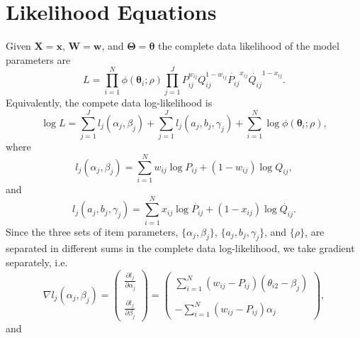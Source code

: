 \documentclass[doc]{apa7}
\begin{document}
  \section{Likelihood Equations}
  Given $\bm{X} = \bm{x}$, $\bm{W} = \bm{w}$, and $\bm{\Theta} = \bm{\theta}$
  the complete data likelihood of the model parameters are
  \begin{equation}
    L = \prod_{i=1}^{N} \phi(\bm{\theta}_i;\rho)\prod_{j=1}^{J} P_{ij}^{w_{ij}} Q_{ij}^{1-w_{ij}}
    \dot{P_{ij}}^{x_{ij}} \dot{Q_{ij}}^{1-x_{ij}}.
  \end{equation}
  Equivalently, the compete data log-likelihood is
  \begin{equation}
    \log L = \sum_{j=1}^{J}l_j(\alpha_j, \beta_j) + \sum_{j=1}^{J}l_j(a_j,
    b_j,\gamma_j) + \sum_{i=1}^{N} \log \phi(\bm{\theta}_i;\rho),
  \end{equation}
  where
  \begin{equation}
    l_j(\alpha_j, \beta_j) = \sum_{i=1}^{N} w_{ij}\log P_{ij} + (1-w_{ij})\log
    Q_{ij},
  \end{equation}
  and
  \begin{equation}
    l_j(a_j,b_j,\gamma_j) = \sum_{i=1}^{N} x_{ij}\log \dot{P_{ij}} + (1-x_
    {ij})\log \dot{Q_{ij}}.
  \end{equation}
  Since the three sets of item parameters, $\{\alpha_j, \beta_j\}$, $\{a_j,
  b_j, \gamma_j\}$, and $\{\rho\}$, are separated in different sums in the
  complete data log-likelihood, we take gradient separately, i.e.
  \begin{equation}
  \label{eq:lik_eq_alpha_beta}
    \nabla l_j(\alpha_j, \beta_j) = 
    \begin{pmatrix}
      \frac{\partial l_j}{\partial \alpha_j}\\
      \\
      \frac{\partial l_j}{\partial \beta_j}
    \end{pmatrix}=
    \begin{pmatrix}
      \sum_{i=1}^{N} (w_{ij}-P_{ij})(\theta_{i2}-\beta_j)\\
      \\
      -\sum_{i=1}^{N} (w_{ij}-P_{ij})\alpha_j
    \end{pmatrix},
  \end{equation}
  and
\end{document}
